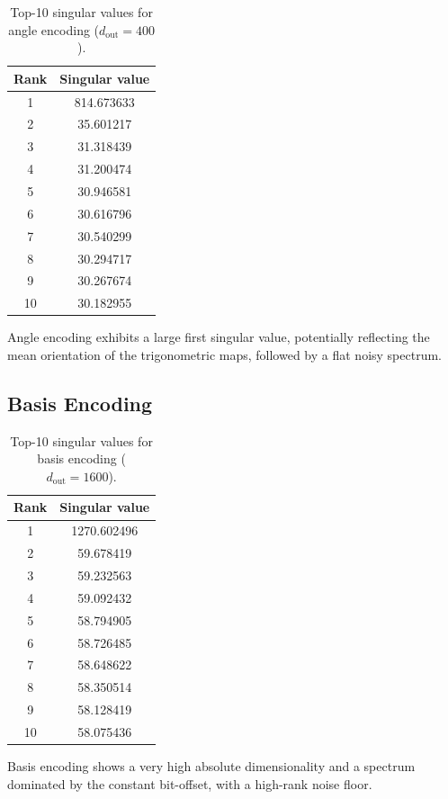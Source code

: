 \documentclass[11pt, a4paper]{article}
\begin{document}
\begin{table}[h]
\centering
\begin{tabular}{cc}
\toprule
\textbf{Rank} & \textbf{Singular value} \\
\midrule
1  & 814.673633 \\
2  & 35.601217  \\
3  & 31.318439  \\
4  & 31.200474  \\
5  & 30.946581  \\
6  & 30.616796  \\
7  & 30.540299  \\
8  & 30.294717  \\
9  & 30.267674  \\
10 & 30.182955  \\
\bottomrule
\end{tabular}
\caption{Top-10 singular values for angle encoding ($d_\mathrm{out} = 400$).}
\end{table}

Angle encoding exhibits a large first singular value, potentially reflecting
the mean orientation of the trigonometric maps, followed by a flat noisy 
spectrum.

\subsection{Basis Encoding}

\begin{table}[h]
\centering
\begin{tabular}{cc}
\toprule
\textbf{Rank} & \textbf{Singular value} \\
\midrule
1  & 1270.602496 \\
2  & 59.678419   \\
3  & 59.232563   \\
4  & 59.092432   \\
5  & 58.794905   \\
6  & 58.726485   \\
7  & 58.648622   \\
8  & 58.350514   \\
9  & 58.128419   \\
10 & 58.075436   \\
\bottomrule
\end{tabular}
\caption{Top-10 singular values for basis encoding ($d_\mathrm{out} = 1600$).}
\end{table}

Basis encoding shows a very high absolute dimensionality and a spectrum 
dominated by the constant bit-offset, with a high-rank noise floor.
\end{document}
